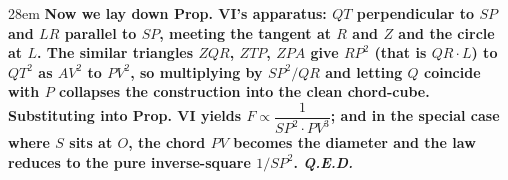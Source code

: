 \documentclass[border=4pt]{standalone}
\begin{document}
\begin{varwidth}{28em}
\large\bfseries
Now we lay down Prop. VI's apparatus: \textcolor{constred}{$QT$ perpendicular to $SP$} and \textcolor{constred}{$LR$ parallel to $SP$},      meeting the tangent at $R$ and $Z$ and the circle at $L$.      The similar triangles $ZQR$, $ZTP$, $ZPA$ give $RP^2$ (that is $QR\cdot L$) to $QT^2$ as $AV^2$ to $PV^2$,      so multiplying by $SP^2/QR$ and letting $Q$ coincide with $P$ collapses the \textcolor{constred}{construction} into the clean chord-cube.      Substituting into Prop. VI yields $F \propto \dfrac{1}{SP^2\cdot PV^3}$; and in the special case where $S$ sits at $O$,      the chord $PV$ becomes the diameter and the law reduces to the pure inverse-square $1/SP^2$. \textit{Q.E.D.}
\end{varwidth}
\end{document}
